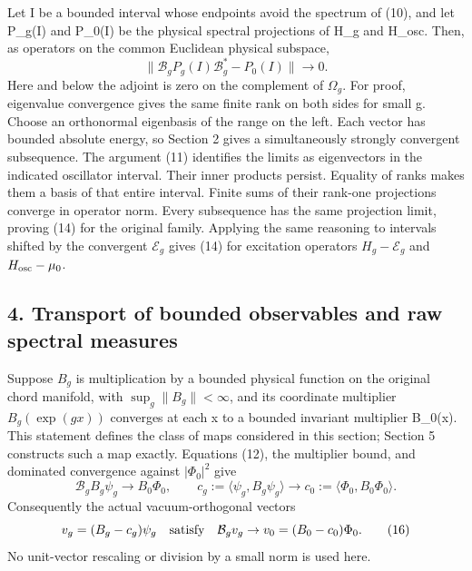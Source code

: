 \documentclass[
  11pt,
]{article}
\begin{document}
Let I be a bounded interval whose endpoints avoid the spectrum of (10),
and let P\_g(I) and P\_0(I) be the physical spectral projections of H\_g
and H\_osc. Then, as operators on the common Euclidean physical
subspace, \[
 \|\mathcal B_gP_g(I)\mathcal B_g^*-P_0(I)\|\longrightarrow0.
                                                               \tag{14}
\] Here and below the adjoint is zero on the complement of \(\Omega_g\).
For proof, eigenvalue convergence gives the same finite rank on both
sides for small g. Choose an orthonormal eigenbasis of the range on the
left. Each vector has bounded absolute energy, so Section 2 gives a
simultaneously strongly convergent subsequence. The argument (11)
identifies the limits as eigenvectors in the indicated oscillator
interval. Their inner products persist. Equality of ranks makes them a
basis of that entire interval. Finite sums of their rank-one projections
converge in operator norm. Every subsequence has the same projection
limit, proving (14) for the original family. Applying the same reasoning
to intervals shifted by the convergent \(\mathcal E_g\) gives (14) for
excitation operators \(H_g-\mathcal E_g\) and \(H_{\rm osc}-\mu_0\).

\subsection{4. Transport of bounded observables and raw spectral
measures}\label{weak-coupling-part-2-transport-of-bounded-observables-and-raw-spectral-measures}

Suppose \(B_g\) is multiplication by a bounded physical function on the
original chord manifold, with \(\sup_g\|B_g\|<\infty\), and its
coordinate multiplier \(B_g(\exp(gx))\) converges at each x to a bounded
invariant multiplier B\_0(x). This statement defines the class of maps
considered in this section; Section 5 constructs such a map exactly.
Equations (12), the multiplier bound, and dominated convergence against
\(|\Phi_0|^2\) give \[
 \mathcal B_gB_g\psi_g\to B_0\Phi_0,\qquad
 c_g:=\langle\psi_g,B_g\psi_g\rangle
                  \to c_0:=\langle\Phi_0,B_0\Phi_0\rangle.
                                                               \tag{15}
\] Consequently the actual vacuum-orthogonal vectors \[
 v_g=(B_g-c_g)\psi_g
       \quad\hbox{satisfy}\quad
 \mathcal B_gv_g\to v_0=(B_0-c_0)\Phi_0.                  \tag{16}
\] No unit-vector rescaling or division by a small norm is used here.
\end{document}
